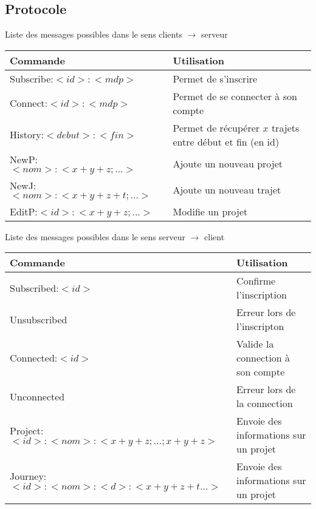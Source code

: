 \documentclass[a4paper, 11pt]{report}
\begin{document}
\subsection{Protocole}
	\begin{center}
		Liste des messages possibles dans le sens clients $\rightarrow$ serveur
		\par
		\begin{tabular}{|l|l|}
			\hline
			Commande & Utilisation\\
			\hline
			Subscribe:$<id>:<mdp>$ & Permet de s'inscrire\\
			\hline
			Connect:$<id>:<mdp>$ & Permet de se connecter à son compte\\
			\hline
			\hline
			History:$<debut>:<fin>$ & Permet de récupérer $x$ trajets entre début et fin (en id)\\
			\hline
			NewP:$<nom>:<x+y+z;...>$ & Ajoute un nouveau projet\\
			\hline
			NewJ:$<nom>:<x+y+z+t;...>$ & Ajoute un nouveau trajet\\
			\hline
			EditP:$<id>:<x+y+z;...>$ & Modifie un projet\\
			\hline
		\end{tabular}
	\end{center}
	\begin{center}
		Liste des messages possibles dans le sens serveur $\rightarrow$ client
		\par
		\begin{tabular}{|l|l|}
			\hline
			Commande & Utilisation\\
			\hline
			Subscribed:$<id>$ & Confirme l'inscription \\
			\hline
			Unsubscribed & Erreur lors de l'inscripton \\
			\hline
			Connected:$<id>$ & Valide la connection à son compte\\
			\hline
			Unconnected & Erreur lors de la connection \\
			\hline
			\hline
			Project:$<id>:<nom>:<x+y+z;...;x+y+z>$ & Envoie des informations sur un projet\\
			\hline
			Journey:$<id>:<nom>:<d>:<x+y+z+t...>$ & Envoie des informations sur un projet\\
			\hline
		\end{tabular}
	\end{center}
\end{document}
